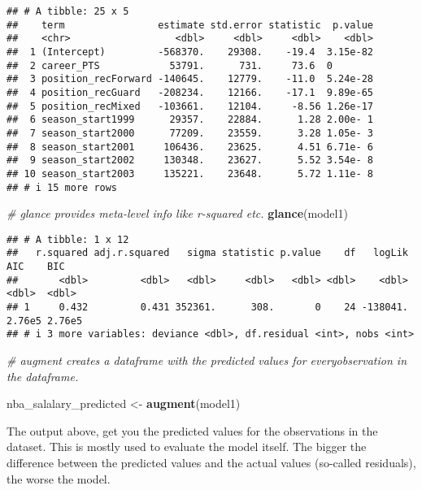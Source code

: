 \documentclass[
]{book}
\newenvironment{Shaded}{\begin{snugshade}}{\end{snugshade}}
\newcommand{\CommentTok}[1]{\textcolor[rgb]{0.56,0.35,0.01}{\textit{#1}}}
\newcommand{\FunctionTok}[1]{\textcolor[rgb]{0.13,0.29,0.53}{\textbf{#1}}}
\newcommand{\NormalTok}[1]{#1}
\newcommand{\OtherTok}[1]{\textcolor[rgb]{0.56,0.35,0.01}{#1}}
\begin{document}
\begin{verbatim}
## # A tibble: 25 x 5
##    term                estimate std.error statistic  p.value
##    <chr>                  <dbl>     <dbl>     <dbl>    <dbl>
##  1 (Intercept)         -568370.    29308.    -19.4  3.15e-82
##  2 career_PTS            53791.      731.     73.6  0       
##  3 position_recForward -140645.    12779.    -11.0  5.24e-28
##  4 position_recGuard   -208234.    12166.    -17.1  9.89e-65
##  5 position_recMixed   -103661.    12104.     -8.56 1.26e-17
##  6 season_start1999      29357.    22884.      1.28 2.00e- 1
##  7 season_start2000      77209.    23559.      3.28 1.05e- 3
##  8 season_start2001     106436.    23625.      4.51 6.71e- 6
##  9 season_start2002     130348.    23627.      5.52 3.54e- 8
## 10 season_start2003     135221.    23648.      5.72 1.11e- 8
## # i 15 more rows
\end{verbatim}

\begin{Shaded}
\begin{Highlighting}[]
\CommentTok{\# glance provides meta{-}level info like r{-}squared etc.}
\FunctionTok{glance}\NormalTok{(model1)}
\end{Highlighting}
\end{Shaded}

\begin{verbatim}
## # A tibble: 1 x 12
##   r.squared adj.r.squared   sigma statistic p.value    df   logLik    AIC    BIC
##       <dbl>         <dbl>   <dbl>     <dbl>   <dbl> <dbl>    <dbl>  <dbl>  <dbl>
## 1     0.432         0.431 352361.      308.       0    24 -138041. 2.76e5 2.76e5
## # i 3 more variables: deviance <dbl>, df.residual <int>, nobs <int>
\end{verbatim}

\begin{Shaded}
\begin{Highlighting}[]
\CommentTok{\# augment creates a dataframe with the predicted values for everyobservation in the dataframe. }

\NormalTok{nba\_salalary\_predicted }\OtherTok{\textless{}{-}} \FunctionTok{augment}\NormalTok{(model1)}
\end{Highlighting}
\end{Shaded}

The output above, get you the predicted values for the observations in the dataset. This is mostly used to evaluate the model itself. The bigger the difference between the predicted values and the actual values (so-called residuals), the worse the model.
\end{document}
